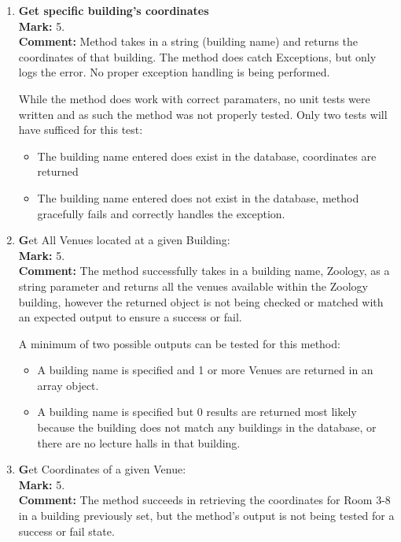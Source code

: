 \documentclass[12pt]{article}
\begin{document}
\begin{enumerate}
		\item \textbf {Get specific building's coordinates}\\
		\textbf{Mark: }
		5.\\
		\textbf{Comment: }
		Method takes in a string (building name) and returns the coordinates of that building.
		The method does catch Exceptions, but only logs the error. No proper exception handling is being performed.
		
		While the method does work with correct paramaters, no unit tests were written and as such the method was not properly tested.
		Only two tests will have sufficed for this test:  
		\begin{itemize}
			\item The building name entered does exist in the database, coordinates are returned
			\item The building name entered does not exist in the database, method gracefully fails and correctly handles the exception.
		\end{itemize}
		
		\item \textbf Get All Venues located at a given Building:\\
		\textbf{Mark: }
		5.\\
		\textbf{Comment: }
		The method successfully takes in a building name, Zoology, as a string parameter and returns all the venues available within the Zoology building, however the returned object is not being checked or matched with an expected output to ensure a success or fail.
		
		A minimum of two possible outputs can be tested for this method:
		\begin{itemize}
			\item A building name is specified and 1 or more Venues are returned in an array object.  
			\item A building name is specified but 0 results are returned most likely because the building does not match any buildings in the database, or there are no lecture halls in that building.  
		\end{itemize}
		
		\item \textbf Get Coordinates of a given Venue:\\
		\textbf{Mark: }
		5.\\
		\textbf{Comment: }
		The method succeeds in retrieving the coordinates for Room 3-8 in a building previously set, but the method's output is not being tested for a success or fail state.  
		

\end{enumerate}
\end{document}
